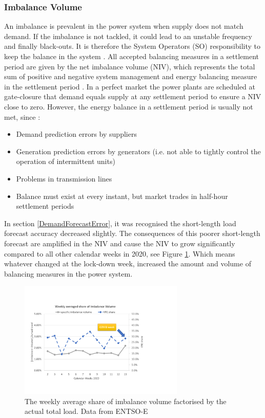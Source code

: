 \documentclass[energies,article,submit,moreauthors,pdftex]{Definitions/mdpi}
\begin{document}
\subsubsection{Imbalance Volume}\label{section:ImbalanceVolume}

An imbalance is prevalent in the power system when supply does not match demand. If the imbalance is not tackled, it could lead to an unstable frequency and finally black-outs. It is therefore the System Operators (SO) responsibility to keep the balance in the system \cite{ELEXON2020ELEXONBMRS}. All accepted balancing measures in a settlement period are given by the net imbalance volume (NIV), which represents the total sum of positive and negative system management and energy balancing measure in the settlement period \cite{ELEXON2020ELEXONBMRS}. In a perfect market the power plants are scheduled at gate-closure that demand equals supply at any settlement period to ensure a NIV close to zero. However, the energy balance in a settlement period is usually not met, since \cite{ELEXON2019GuidanceBritain}:
\begin{itemize}
    \item Demand prediction errors by suppliers
    \item Generation prediction errors by generators (i.e. not able to tightly control the operation of intermittent units)
    \item Problems in transmission lines
    \item Balance must exist at every instant, but market trades in half-hour settlement periods 
\end{itemize}

In section \ref{DemandForecastError}, it was recognised the short-length load forecast accuracy decreased slightly. The consequences of this poorer short-length forecast are amplified in the NIV and cause the NIV to grow significantly compared to all other calendar weeks in 2020, see Figure \ref{fig:ImbalanceVolume_over_2020}. Which means whatever changed at the lock-down week, increased the amount and volume of balancing measures in the power system.


\begin{figure}[H]
\centering
\hspace{-25pt}\includegraphics[trim={0cm 2cm 6.5cm 3.5cm},clip,width=0.7\textwidth]{Graphics/Illustration-Imbalance-2020.pdf}
\caption{The weekly average share of imbalance volume factorised by the actual total load. Data from ENTSO-E \protect\cite{ENTSO-E2020ENTSO-EPlatform}}
\label{fig:ImbalanceVolume_over_2020}
\end{figure} 
\end{document}
